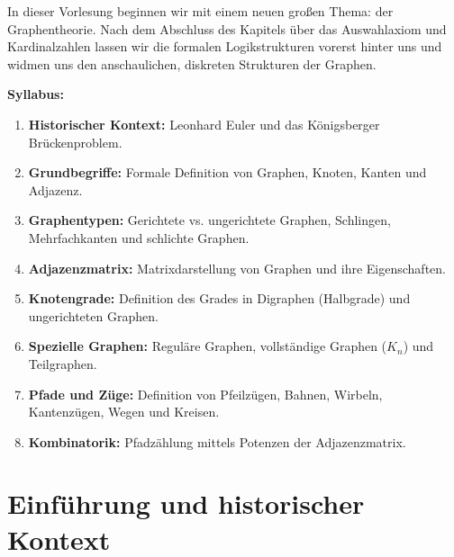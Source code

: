

\begin{nice-box}
In dieser Vorlesung beginnen wir mit einem neuen großen Thema: der Graphentheorie. Nach dem Abschluss des Kapitels über das Auswahlaxiom und Kardinalzahlen lassen wir die formalen Logikstrukturen vorerst hinter uns und widmen uns den anschaulichen, diskreten Strukturen der Graphen.

\textbf{Syllabus:}
\begin{enumerate}[label=\textbf{\arabic*.}]
    \item \textbf{Historischer Kontext:} Leonhard Euler und das Königsberger Brückenproblem.
    \item \textbf{Grundbegriffe:} Formale Definition von Graphen, Knoten, Kanten und Adjazenz.
    \item \textbf{Graphentypen:} Gerichtete vs. ungerichtete Graphen, Schlingen, Mehrfachkanten und schlichte Graphen.
    \item \textbf{Adjazenzmatrix:} Matrixdarstellung von Graphen und ihre Eigenschaften.
    \item \textbf{Knotengrade:} Definition des Grades in Digraphen (Halbgrade) und ungerichteten Graphen.
    \item \textbf{Spezielle Graphen:} Reguläre Graphen, vollständige Graphen ($K_n$) und Teilgraphen.
    \item \textbf{Pfade und Züge:} Definition von Pfeilzügen, Bahnen, Wirbeln, Kantenzügen, Wegen und Kreisen.
    \item \textbf{Kombinatorik:} Pfadzählung mittels Potenzen der Adjazenzmatrix.
\end{enumerate}
\end{nice-box}

\section{Einführung und historischer Kontext}

